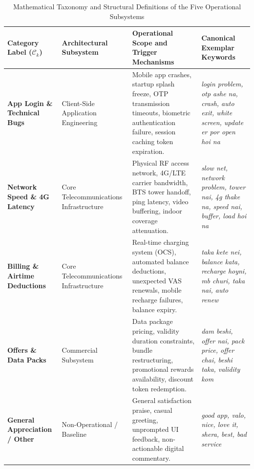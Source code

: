 \documentclass[review,12pt,authoryear]{elsarticle}
\begin{document}
\begin{table}[t]
\centering
\caption{Mathematical Taxonomy and Structural Definitions of the Five Operational Subsystems}
\label{tab:taxonomy}
\footnotesize
\setlength{\tabcolsep}{6pt}
\begin{tabularx}{\textwidth}{@{}lp{3.8cm}p{5.5cm}X@{}}
\toprule
Category Label ($\mathcal{C}_k$) & Architectural Subsystem & Operational Scope and Trigger Mechanisms & Canonical Exemplar Keywords \\
\midrule
\textbf{App Login \& Technical Bugs} & Client-Side Application Engineering & Mobile app crashes, startup splash freeze, OTP transmission timeouts, biometric authentication failure, session caching token expiration. & \textit{login problem, otp ashe na, crash, auto exit, white screen, update er por open hoi na} \\
\addlinespace
\textbf{Network Speed \& 4G Latency} & Core Telecommunications Infrastructure & Physical RF access network, 4G/LTE carrier bandwidth, BTS tower handoff, ping latency, video buffering, indoor coverage attenuation. & \textit{slow net, network problem, tower nai, 4g thake na, speed nai, buffer, load hoi na} \\
\addlinespace
\textbf{Billing \& Airtime Deductions} & Core Telecommunications Infrastructure & Real-time charging system (OCS), automated balance deductions, unexpected VAS renewals, mobile recharge failures, balance expiry. & \textit{taka kete nei, balance kata, recharge hoyni, mb churi, taka nai, auto renew} \\
\addlinespace
\textbf{Offers \& Data Packs} & Commercial Subsystem & Data package pricing, validity duration constraints, bundle restructuring, promotional rewards availability, discount token redemption. & \textit{dam beshi, offer nai, pack price, offer chai, beshi taka, validity kom} \\
\addlinespace
\textbf{General Appreciation / Other} & Non-Operational / Baseline & General satisfaction praise, casual greeting, unprompted UI feedback, non-actionable digital commentary. & \textit{good app, valo, nice, love it, shera, best, bad service} \\
\bottomrule
\end{tabularx}
\end{table}
\end{document}

